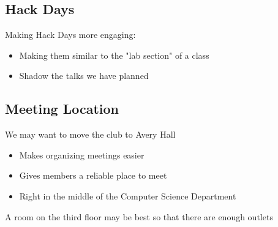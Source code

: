 \subsection{Hack Days}
Making Hack Days more engaging:
\begin{itemize}
    \item Making them similar to the "lab section" of a class
    \item Shadow the talks we have planned
\end{itemize}

\subsection{Meeting Location}
We may want to move the club to Avery Hall
\begin{itemize}
    \item Makes organizing meetings easier
    \item Gives members a reliable place to meet
    \item Right in the middle of the Computer Science Department
\end{itemize}
A room on the third floor may be best so that there are enough outlets

